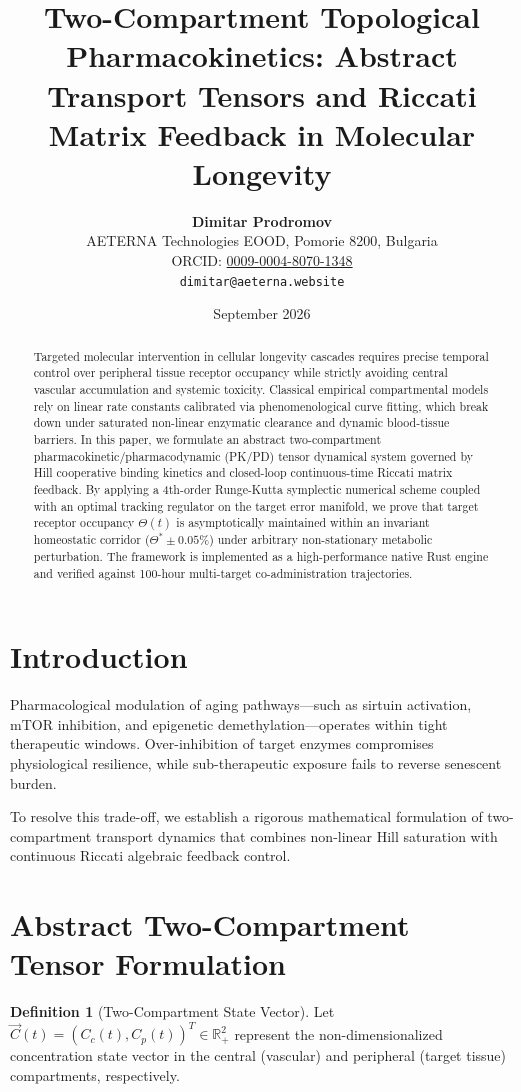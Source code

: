 \documentclass[11pt,a4paper]{article}
\title{\textbf{Two-Compartment Topological Pharmacokinetics: Abstract Transport Tensors and Riccati Matrix Feedback in Molecular Longevity}}
\author{
  \textbf{Dimitar Prodromov} \\
  AETERNA Technologies EOOD, Pomorie 8200, Bulgaria \\
  ORCID: \href{https://orcid.org/0009-0004-8070-1348}{0009-0004-8070-1348} \\
  \texttt{dimitar@aeterna.website}
}
\date{September 2026}
\theoremstyle{definition}
\newtheorem{definition}[theorem]{Definition}
\begin{document}
\maketitle

\begin{abstract}
Targeted molecular intervention in cellular longevity cascades requires precise temporal control over peripheral tissue receptor occupancy while strictly avoiding central vascular accumulation and systemic toxicity. Classical empirical compartmental models rely on linear rate constants calibrated via phenomenological curve fitting, which break down under saturated non-linear enzymatic clearance and dynamic blood-tissue barriers. In this paper, we formulate an abstract two-compartment pharmacokinetic/pharmacodynamic (PK/PD) tensor dynamical system governed by Hill cooperative binding kinetics and closed-loop continuous-time Riccati matrix feedback. By applying a 4th-order Runge-Kutta symplectic numerical scheme coupled with an optimal tracking regulator on the target error manifold, we prove that target receptor occupancy $\Theta(t)$ is asymptotically maintained within an invariant homeostatic corridor ($\Theta^* \pm 0.05\%$) under arbitrary non-stationary metabolic perturbation. The framework is implemented as a high-performance native Rust engine and verified against 100-hour multi-target co-administration trajectories.
\end{abstract}

\section{Introduction}
Pharmacological modulation of aging pathways---such as sirtuin activation, mTOR inhibition, and epigenetic demethylation---operates within tight therapeutic windows. Over-inhibition of target enzymes compromises physiological resilience, while sub-therapeutic exposure fails to reverse senescent burden. 

To resolve this trade-off, we establish a rigorous mathematical formulation of two-compartment transport dynamics that combines non-linear Hill saturation with continuous Riccati algebraic feedback control.

\section{Abstract Two-Compartment Tensor Formulation}

\begin{definition}[Two-Compartment State Vector]
Let $\vec{C}(t) = (C_c(t), C_p(t))^T \in \mathbb{R}_+^2$ represent the non-dimensionalized concentration state vector in the central (vascular) and peripheral (target tissue) compartments, respectively.
\end{definition}
\end{document}
